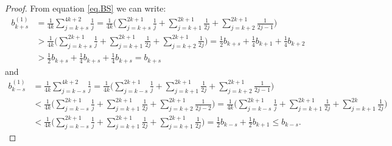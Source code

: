 \documentclass[entropy,article,submit,moreauthors,pdftex]{Definitions/mdpi}
\begin{document}
\begin{proof}
From equation \eqref{eq.BS} we can write:
\begin{equation*}
\begin{split}
b^{(1)}_{k+s}&=\frac{1}{4k}\sum_{j=k+s}^{4k+2}\frac{1}{j}
=\frac{1}{4k}\Bigg(\sum_{j=k+s}^{2k+1}\frac{1}{j}+\sum_{j=k+1}^{2k+1}\frac{1}{2j}+\sum_{j=k+2}^{2k+1}\frac{1}{2j-1}\Bigg)\\
&>\frac{1}{4k}\Bigg(\sum_{j=k+s}^{2k+1}\frac{1}{j}+\sum_{j=k+1}^{2k+1}\frac{1}{2j}+\sum_{j=k+2}^{2k+1}\frac{1}{2j}\Bigg)
=\frac{1}{2}b_{k+s}+\frac{1}{4}b_{k+1}+\frac{1}{4}b_{k+2}\\
&>\frac{1}{2}b_{k+s}+\frac{1}{4}b_{k+s}+\frac{1}{4}b_{k+s}=b_{k+s}
\end{split}
\end{equation*}
 and
\begin{equation*}
\begin{split}
b^{(1)}_{k-s}&=\frac{1}{4k}\sum_{j=k-s}^{4k+2}\frac{1}{j}
=\frac{1}{4k}\Bigg(\sum_{j=k-s}^{2k+1}\frac{1}{j}+\sum_{j=k+1}^{2k+1}\frac{1}{2j}+\sum_{j=k+2}^{2k+1}\frac{1}{2j-1}\Bigg)\\
&<\frac{1}{4k}\Bigg(\sum_{j=k-s}^{2k+1}\frac{1}{j}+\sum_{j=k+1}^{2k+1}\frac{1}{2j}+\sum_{j=k+2}^{2k+1}\frac{1}{2j-2}\Bigg)
=\frac{1}{4k}\Bigg(\sum_{j=k-s}^{2k+1}\frac{1}{j}+\sum_{j=k+1}^{2k+1}\frac{1}{2j}+\sum_{j=k+1}^{2k}\frac{1}{2j}\Bigg)\\
&<\frac{1}{4k}\Bigg(\sum_{j=k-s}^{2k+1}\frac{1}{j}+\sum_{j=k+1}^{2k+1}\frac{1}{2j}+\sum_{j=k+1}^{2k+1}\frac{1}{2j}\Bigg)
=\frac{1}{2}b_{k-s}+\frac{1}{2}b_{k+1}\le b_{k-s}.
\end{split}
\end{equation*}
\end{proof}


\end{document}
